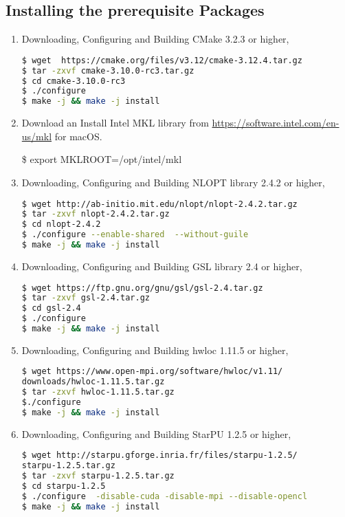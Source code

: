 \documentclass[
10pt, %
a4paper, %
oneside, %
headinclude,footinclude, %
BCOR5mm, %
]{scrartcl}
\begin{document}
\subsection{Installing the prerequisite Packages}
\begin{enumerate}
\item
\noindent Downloading, Configuring and Building CMake 3.2.3 or higher,
\begin{lstlisting}[language=bash]
$ wget  https://cmake.org/files/v3.12/cmake-3.12.4.tar.gz
$ tar -zxvf cmake-3.10.0-rc3.tar.gz
$ cd cmake-3.10.0-rc3
$ ./configure 
$ make -j && make -j install
\end{lstlisting}

\item

\noindent Download an Install Intel MKL library from \url{https://software.intel.com/en-us/mkl} for macOS.

\noindent \$ export MKLROOT=/opt/intel/mkl

\item
\noindent Downloading, Configuring and Building NLOPT library 2.4.2 or higher,
\begin{lstlisting}[language=bash]
$ wget http://ab-initio.mit.edu/nlopt/nlopt-2.4.2.tar.gz
$ tar -zxvf nlopt-2.4.2.tar.gz
$ cd nlopt-2.4.2
$ ./configure --enable-shared  --without-guile
$ make -j && make -j install
\end{lstlisting}

\item
\noindent Downloading, Configuring and Building GSL library 2.4 or higher,
\begin{lstlisting}[language=bash]
$ wget https://ftp.gnu.org/gnu/gsl/gsl-2.4.tar.gz
$ tar -zxvf gsl-2.4.tar.gz
$ cd gsl-2.4
$ ./configure 
$ make -j && make -j install
\end{lstlisting}

\item
\noindent Downloading, Configuring and Building hwloc 1.11.5 or higher,
\begin{lstlisting}[language=bash]
$ wget https://www.open-mpi.org/software/hwloc/v1.11/
downloads/hwloc-1.11.5.tar.gz
$ tar -zxvf hwloc-1.11.5.tar.gz
$./configure
$ make -j && make -j install
\end{lstlisting}

\item
\noindent Downloading, Configuring and Building StarPU 1.2.5 or higher,
\begin{lstlisting}[language=bash]
$ wget http://starpu.gforge.inria.fr/files/starpu-1.2.5/
starpu-1.2.5.tar.gz
$ tar -zxvf starpu-1.2.5.tar.gz
$ cd starpu-1.2.5
$ ./configure  -disable-cuda -disable-mpi --disable-opencl
$ make -j && make -j install
\end{lstlisting}


\end{enumerate}
\end{document}
